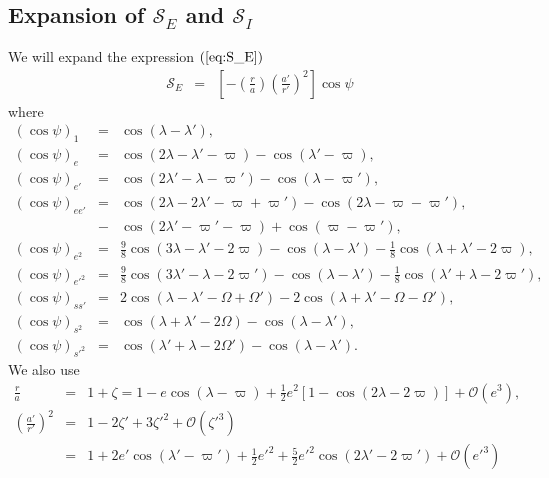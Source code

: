 \documentclass [12pt, a4paper] {article}
\begin{document}
\subsection{Expansion of $\mathcal{S}_E$ and $\mathcal{S}_I$}
We will expand the expression $(\ref{eq:S_E})$
\begin {eqnarray}
    \label{eq:S_E_repeat}
    \mathcal{S}_E 
    &=& 
    \left[
        -
        \left(
            \frac{r}{a}
        \right)
        \left(
            \frac{a'}{r'}
        \right)^2
    \right]\cos\psi
\end {eqnarray}
where
\begin {eqnarray}
    (\cos\psi)_1 
    &=&
    \cos(\lambda - \lambda'),
    \\
    (\cos\psi)_e
    &=& 
    \cos(2\lambda - \lambda' - \varpi) - \cos(\lambda' - \varpi),
    \\
    (\cos\psi)_{e'}
    &=& 
    \cos(2\lambda' - \lambda - \varpi') - \cos(\lambda - \varpi'),
    \\
    (\cos\psi)_{ee'}
    &=& 
    \cos(2\lambda - 2\lambda' - \varpi + \varpi')
    -
    \cos(2\lambda - \varpi - \varpi'),
    \\\nonumber
    &-&
    \cos(2\lambda' - \varpi' - \varpi)
    +
    \cos(\varpi - \varpi'),
    \\
    (\cos\psi)_{e^2}
    &=&
    \frac{9}{8}\cos(3\lambda - \lambda' - 2\varpi)
    -
    \cos(\lambda - \lambda')
    -
    \frac{1}{8}\cos(\lambda + \lambda' - 2\varpi),
    \\
    (\cos\psi)_{e'^2}
    &=&
    \frac{9}{8}\cos(3\lambda' - \lambda - 2\varpi')
    -
    \cos(\lambda - \lambda')
    -
    \frac{1}{8}\cos(\lambda' + \lambda - 2\varpi'),
    \\
    (\cos\psi)_{ss'}
    &=&
    2\cos(\lambda - \lambda' - \Omega + \Omega') 
    -
    2\cos(\lambda + \lambda' - \Omega - \Omega'),
    \\
    (\cos\psi)_{s^2}
    &=&
    \cos(\lambda + \lambda' - 2\Omega) - \cos(\lambda - \lambda'),
    \\
    (\cos\psi)_{s'^2}
    &=&
    \cos(\lambda' + \lambda - 2\Omega') - \cos(\lambda - \lambda').
\end {eqnarray}
We also use 
\begin {eqnarray}
    \frac{r}{a}
    &=& 
    1 + \zeta
    =
    1 - e\cos(\lambda - \varpi) + \frac{1}{2}e^2[1 - \cos(2\lambda - 2\varpi)]
    +
    \mathcal{O}(e^3),
    \\
    \left(
        \frac{a'}{r'}
    \right)^2
    &=&
    1 - 2\zeta' + 3\zeta'^2 + \mathcal{O}(\zeta'^3)
    \\
    &=&
    1 + 2e'\cos(\lambda' - \varpi') + \frac{1}{2}e'^2
    + \frac{5}{2}e'^2\cos(2\lambda' - 2\varpi')
    + \mathcal{O}(e'^3)
\end {eqnarray}
\end{document}
